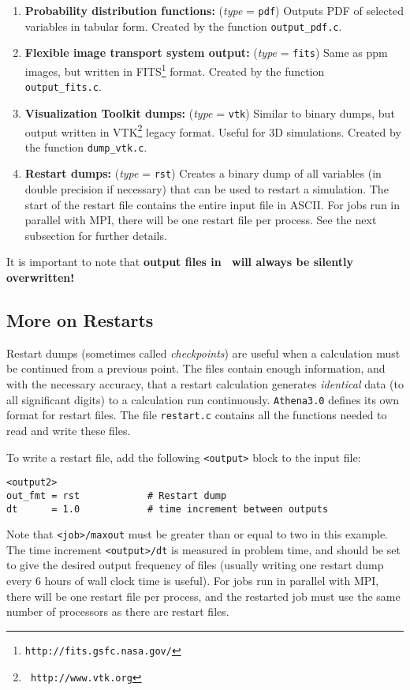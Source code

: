 \begin{enumerate}
\item {\bf Probability distribution functions:} ({\em type} = {\tt pdf})
Outputs PDF of selected variables in tabular form.  Created by the
function {\tt output\_pdf.c}.

\item {\bf Flexible image transport system output:} ({\em type} = {\tt fits}) Same as ppm images,
but written in FITS\footnote{{\tt http://fits.gsfc.nasa.gov/}} format.
Created by the function {\tt output\_fits.c}.

\item {\bf Visualization Toolkit dumps:} ({\em type} = {\tt vtk})
Similar to binary dumps, but output written in VTK\footnote{\tt
http://www.vtk.org} legacy format.  Useful for 3D simulations.  Created by
the function {\tt dump\_vtk.c}.

\item {\bf Restart dumps:} ({\em type} = {\tt rst}) Creates a binary dump
of all variables (in double precision if necessary) that can be used to
restart a simulation.  The start of the restart file contains the entire
input file in ASCII.  For jobs run in parallel with MPI, there will be
one restart file per process.
See the next subsection for further details.

\end{enumerate}

\noindent
It is important to note that {\bf output files in \ath\ will always be
silently overwritten!} 

\subsection{More on Restarts}

Restart dumps (sometimes called {\em checkpoints}) are useful when a 
calculation must be continued from a previous point.  The files contain
enough information, and with the necessary accuracy, that a restart calculation
generates {\em identical} data (to all significant digits) to a calculation run
continuously.  {\tt Athena3.0} defines its
own format for restart files.  The file {\tt restart.c} contains all
the functions needed to read and write these files.

To write a restart file, add the following {\tt <output>} block to the
input file:
\begin{verbatim}
<output2>
out_fmt = rst            # Restart dump
dt      = 1.0            # time increment between outputs
\end{verbatim}
Note that {\tt <job>/maxout} must be greater than or equal to two in this
example.  The time increment {\tt <output>/dt} is measured in problem time, 
and should be set to give the desired output frequency of files
(usually writing one restart dump every 6 hours of wall clock time is useful).
For jobs run in parallel with MPI, there will be one restart file per process,
and the restarted job must use the same number of processors as there are
restart files.

